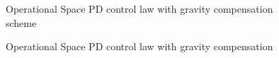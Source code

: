 \documentclass{article}
\begin{document}
\begin{figure}[H]
    \noindent

    \caption{Operational Space PD control law with gravity compensation scheme}
    \label{fig:op_space_PD_g_comp_scheme}
\end{figure}

\begin{figure}[H]
    \noindent

    \caption{Operational Space PD control law with gravity compensation}
    \label{fig:op_space_PD_g_comp_joints}
\end{figure}
\end{document}
